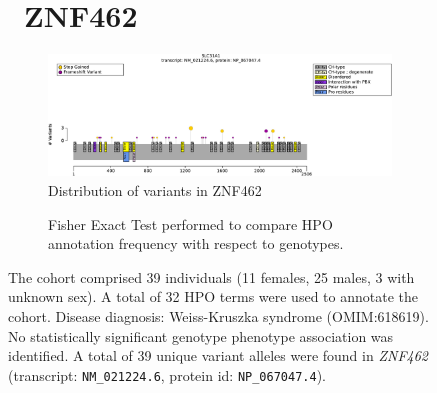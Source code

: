 \begin{figure}[htbp]
\section*{ ZNF462}
\centering
\begin{subfigure}[b]{0.95\textwidth}
\centering
\includegraphics[width=\textwidth]{ img/ZNF462_protein_diagram.pdf} 
\captionsetup{justification=raggedright,singlelinecheck=false}
\caption{Distribution of variants in ZNF462}
\end{subfigure}

\vspace{2em}

\begin{subfigure}[b]{0.95\textwidth}
\centering
{}
\captionsetup{justification=raggedright,singlelinecheck=false}
\caption{Fisher Exact Test performed to compare HPO annotation frequency with respect to genotypes. }
\end{subfigure}

\vspace{2em}

\caption{ The cohort comprised 39 individuals (11 females, 25 males, 3 with unknown sex). 
A total of 32 HPO terms were used to annotate the cohort. Disease diagnosis: Weiss-Kruszka syndrome (OMIM:618619). 
No statistically significant genotype phenotype association was identified. 
A total of 39 unique variant alleles were found in \textit{ZNF462} (transcript: \texttt{NM\_021224.6}, protein id: \texttt{NP\_067047.4}).}
\end{figure}
